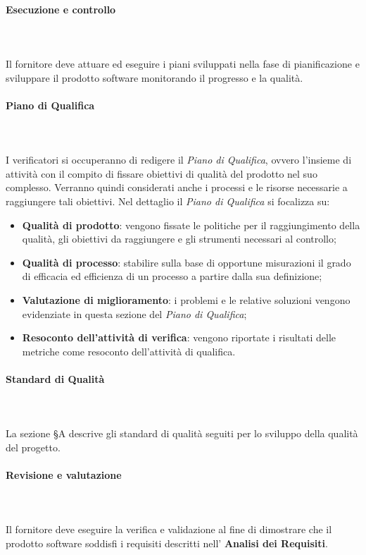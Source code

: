 			\paragraph{Esecuzione e controllo} \mbox{} \\ \mbox{} \\
Il fornitore deve attuare ed eseguire i piani sviluppati nella fase di pianificazione e sviluppare il prodotto software monitorando il progresso e la qualità.
			\paragraph*{Piano di Qualifica} \mbox{} \\ \mbox{} \\
			I verificatori si occuperanno di redigere il \textit{Piano di Qualifica}, ovvero l'insieme di attività con il compito di fissare obiettivi di qualità del prodotto nel suo complesso. Verranno quindi considerati anche i processi e le risorse necessarie a raggiungere tali obiettivi. Nel dettaglio il \textit{Piano di Qualifica} si focalizza su:
			\begin{itemize}
				\item \textbf{Qualità di prodotto}: vengono fissate le politiche per il raggiungimento della qualità, gli obiettivi da raggiungere e gli strumenti necessari al controllo;
				\item \textbf{Qualità di processo}: stabilire sulla base di opportune misurazioni il grado di efficacia ed efficienza di un processo a partire dalla sua definizione;
				\item \textbf{Valutazione di miglioramento}: i problemi e le relative soluzioni vengono evidenziate in questa sezione del \textit{Piano di Qualifica};
				\item \textbf{Resoconto dell'attività di verifica}: vengono riportate i risultati delle metriche come resoconto dell'attività di qualifica.
			\end{itemize}
			
			\paragraph*{Standard di Qualità} \mbox{} \\ \mbox{} \\
			La sezione \S A descrive gli standard di qualità seguiti per lo sviluppo della qualità del progetto.
			
			\paragraph{Revisione e valutazione} \mbox{} \\ \mbox{} \\
			Il fornitore deve eseguire la verifica e validazione al fine di dimostrare che il prodotto software soddisfi i requisiti descritti nell' \textbf{Analisi dei Requisiti}.
